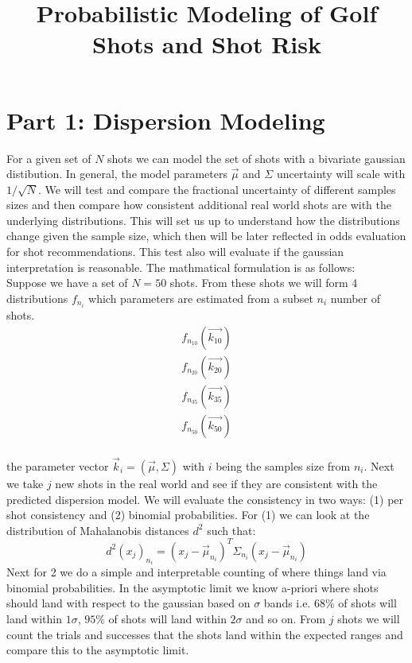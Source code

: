 \documentclass{article}
\title{Probabilistic Modeling of Golf Shots and Shot Risk}
\begin{document}
\maketitle


\section{Part 1: Dispersion Modeling}
For a given set of $N$ shots we can model the set of shots with a bivariate gaussian distibution. In general, the model parameters $\vec{\mu}$ and $\Sigma$ uncertainty will scale with $1/\sqrt{N}$. We will test and compare the fractional uncertainty of different samples sizes and then compare how consistent additional real world shots are with the underlying distributions. This will set us up to understand how the distributions change given the sample size, which then will be later reflected in odds evaluation for shot recommendations. This test also will evaluate if the gaussian interpretation is reasonable. The mathmatical formulation is as follows:\\


Suppose we have a set of $N=50$ shots. From these shots we will form 4 distributions $f_{n_i}$ which parameters are estimated from a subset $n_i$ number of shots.
\begin{equation}
\begin{split}
f_{n_{10}}( \vec{k_{10}} ) \\
f_{n_{20}}( \vec{k_{20}} ) \\
f_{n_{35}}( \vec{k_{35}} ) \\
f_{n_{50}}( \vec{k_{50}} ) \\
\end{split}
\end{equation}

the parameter vector $\vec{k}_i = (\vec{\mu}, \Sigma)$ with $i$ being the samples size from $n_i$. Next we take $j$ new shots in the real world and see if they are consistent with the predicted dispersion model. We will evaluate the consistency in two ways: (1) per shot consistency and (2) binomial probabilities. For (1) we can look at the distribution of Mahalanobis distances $d^2$ such that:
\begin{equation}
d^2(x_j)_{n_i} = (x_j-\vec{\mu}_{n_i})^T \Sigma_{n_i} (x_j-\vec{\mu}_{n_i})
\end{equation}
Next for 2 we do a simple and interpretable counting of where things land via binomial probabilities. In the asymptotic limit we know a-priori where shots should land with respect to the gaussian based on $\sigma$ bands i.e. $68\%$ of shots will land within $1\sigma$, $95\%$ of shots will land within $2\sigma$ and so on. From $j$ shots we will count the trials and successes that the shots land within the expected ranges and compare this to the asymptotic limit.
\end{document}
